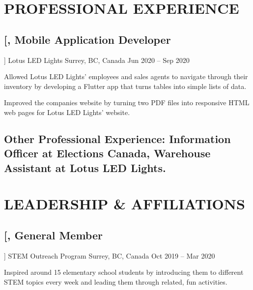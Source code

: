 \documentclass{article}
\newcommand{\datedsubsection}[4][]{
    \subsection*{
        \textbf{\large #2}, #3 \hfill #4
    } %
    \vspace{-4pt} %
    #1 %
}
\begin{document}
{    %
    
    
    
    \section{PROFESSIONAL EXPERIENCE}
    
    
    \datedsubsection
        [\textit{Mobile Application Developer}]
        {Lotus LED Lights}
        {Surrey, BC, Canada}
        {Jun 2020 -- Sep 2020}
    
    \begin{compactitem}
    \item Allowed Lotus LED Lights' employees and sales agents to navigate through their inventory by developing a Flutter app that turns tables into simple lists of data.
    \item Improved the companies website by turning two PDF files into responsive HTML web pages for Lotus LED Lights' website.
    \end{compactitem}
    
    
    
    \subsection*{\textbf{Other Professional Experience}: Information Officer at Elections Canada, Warehouse Assistant at Lotus LED Lights.}
    
    
    
    
    \section{LEADERSHIP \& AFFILIATIONS}
    
    
    \datedsubsection
        [\textit{General Member}]
        {STEM Outreach Program}
        {Surrey, BC, Canada}
        {Oct 2019 -- Mar 2020}
    
    \begin{compactitem}
    \item Inspired around 15 elementary school students by introducing them to different STEM topics every week and leading them through related, fun activities.
    \end{compactitem}
    
}
\end{document}

